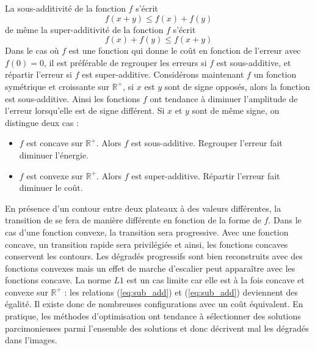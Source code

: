 \documentclass[../main/These_Mathias_Paget.tex]{subfiles}
\begin{document}
La sous-additivité de la fonction $f$ s'écrit
\begin{equation}
f(x+y) \leq f(x) + f(y)
\label{eq:sub_add}
\end{equation}
de même la super-additivité de la fonction $f$ s'écrit
 \begin{equation}
f(x) + f(y) \leq f(x+y)
\label{eq:sup_add}
\end{equation}
Dans le cas où $f$ est une fonction qui donne le coût en fonction de l'erreur avec $f(0)=0$, il est préférable de regrouper les erreurs si $f$ est sous-additive, et répartir l'erreur si $f$ est super-additive. Considérons maintenant $f$ un fonction symétrique et croissante sur $\mathbb{R}^{+}$, si $x$ est $y$ sont de signe opposés, alors la fonction est sous-additive. Ainsi les fonctions $f$ ont tendance à diminuer l'amplitude de l'erreur lorsqu'elle est de signe différent. Si $x$ et $y$ sont de même signe, on distingue deux cas :
\begin{itemize}
\item $f$ est concave sur $\mathbb{R}^{+}$. Alors $f$ est sous-additive. Regrouper l'erreur fait diminuer l’énergie.
\item $f$ est convexe sur $\mathbb{R}^{+}$. Alors $f$ est super-additive. Répartir l'erreur fait diminuer le coût.
\end{itemize}
En présence d'un contour entre deux plateaux à des valeurs différentes, la transition de se fera de manière différente en fonction de la forme de $f$. Dans le cas d'une fonction convexe, la transition sera progressive.  Avec une fonction concave, un transition rapide sera privilégiée et ainsi, les fonctions concaves conservent les contours. Les dégradés progressifs sont bien reconstruits avec des fonctions convexes mais un effet de marche d'escalier peut apparaître avec les fonctions concave. La norme $L1$ est un cas limite car elle est à la fois concave et convexe sur $\mathbb{R}^{+}$ : les relations (\ref{eq:sub_add}) et (\ref{eq:sub_add}) deviennent des égalité. Il existe donc de nombreuses configurations avec un coût équivalent. En pratique, les méthodes d'optimisation ont tendance à sélectionner des solutions parcimonieuses parmi l'ensemble des solutions et donc décrivent mal les dégradés dans l'images.
	
\end{document}
